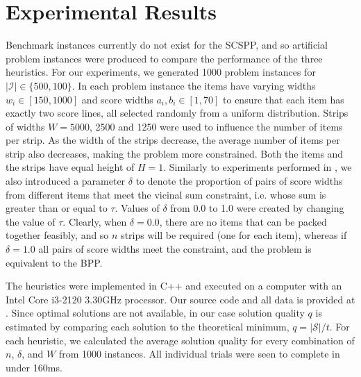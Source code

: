 \documentclass[runningheads]{llncs}
\begin{document}
\section{Experimental Results}
\label{sec:expresults}
Benchmark instances currently do not exist for the SCSPP, and so artificial problem instances were produced to compare the performance of the three heuristics. For our experiments, we generated 1000 problem instances for $|\mathcal{I}| \in \{500, 100\}$. In each problem instance the items have varying widths $w_i \in [150,1000]$ and score widths $a_i, b_i \in [1, 70]$ to ensure that each item has exactly two score lines, all selected randomly from a uniform distribution. Strips of widths $W = 5000$, 2500 and 1250 were used to influence the number of items per strip. As the width of the strips decrease, the average number of items per strip also decreases, making the problem more constrained. Both the items and the strips have equal height of $H = 1$. Similarly to experiments performed in \cite{lewis2011}, we also introduced a parameter $\delta$ to denote the proportion of pairs of score widths from different items that meet the vicinal sum constraint, i.e. whose sum is greater than or equal to $\tau$. Values of $\delta$ from 0.0 to 1.0 were created by changing the value of $\tau$. Clearly, when $\delta = 0.0$, there are no items that can be packed together feasibly, and so $n$ strips will be required (one for each item), whereas if $\delta = 1.0$ all pairs of score widths meet the constraint, and the problem is equivalent to the BPP. 

The heuristics were implemented in C++ and executed on a computer with an Intel Core i3-2120 3.30GHz processor. Our source code and all data is provided at \cite{hawa2018}. Since optimal solutions are not available, in our case solution quality $q$ is estimated by comparing each solution to the theoretical minimum, $q = |\mathcal{S}| / t$. For each heuristic, we calculated the average solution quality for every combination of $n$, $\delta$, and $W$ from 1000 instances. All individual trials were seen to complete in under 160ms.
\end{document}
